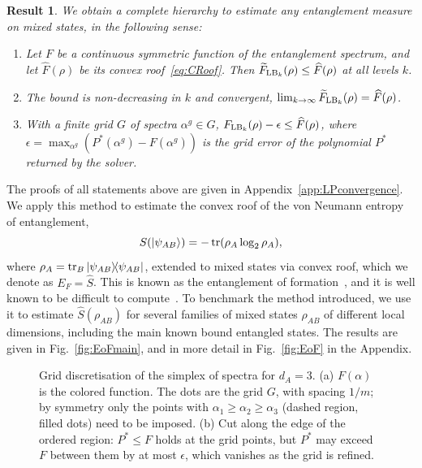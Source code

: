 \documentclass[aps,pra,twocolumn,superscriptaddress]{revtex4-2}
\renewcommand{\a}{\alpha}
\newtheorem{result}[theorem]{Result}
\begin{document}
\begin{result}\label{thm:non-polyHier} We obtain a complete hierarchy to estimate any entanglement measure on mixed states, in the following sense:
\begin{enumerate}
    \item Let $F$ be a continuous symmetric function of the entanglement spectrum, and let $\widehat{F}(\rho)$ be its convex roof~\eqref{eq:CRoof}. Then $\widetilde F_{{\rm LB}_k}(\rho)\leq\widehat F(\rho)$ at all levels $k$.
    \item The bound is non-decreasing in $k$ and convergent, $\lim_{k\to\infty}\widetilde F_{{\rm LB}_k}(\rho)=\widehat F(\rho)$.
    \item With a finite grid $G$ of spectra $\alpha^g\in G$, $F_{{\rm LB}_k}(\rho)-\epsilon\leq\widehat F(\rho)$, where $\epsilon=\max_{\a^g}\left(P^*(\a^g)-F(\a^g)\right)$ is the grid error of the polynomial $P^*$ returned by the solver.
\end{enumerate}
\end{result}


The proofs of all statements above are given in Appendix~\ref{app:LPconvergence}. We apply this method to estimate the convex roof of the von Neumann entropy of entanglement,
\begin{equation}\label{eq:vonNeumann}
    S(\ket{\psi_{AB}}) = -\tr(\rho_A \log_2 \rho_A),
\end{equation}
where $\rho_A = \tr_B \dyad{\psi_{AB}}$, extended to mixed states via convex roof, which we denote as $E_F=\widehat{S}$. This is known as the entanglement of formation~\cite{Bennett1996EoF}, and it is well known to be difficult to compute~\cite{Chen2005EoF}. To benchmark the method introduced, we use it to estimate $\widehat{S}(\rho_{AB})$ for several families of mixed states $\rho_{AB}$ of different local dimensions, including the main known bound entangled states. The results are given in Fig.~\ref{fig:EoFmain}, and in more detail in Fig.~\ref{fig:EoF} in the Appendix.

\begin{figure}[t]
    \centering
    
    \caption{Grid discretisation of the simplex of spectra for $d_A=3$.
    (a) $F(\alpha)$ is the colored function. The dots are the grid $G$, with spacing $1/m$; by symmetry only the points with $\alpha_1\geq\alpha_2\geq\alpha_3$ (dashed region, filled dots) need to be imposed.
    (b) Cut along the edge of the ordered region: $P^*\leq F$ holds at the grid points, but $P^*$ may exceed $F$ between them by at most $\epsilon$, which vanishes as the grid is refined.}
    \label{fig:grid}
\end{figure}
\end{document}

